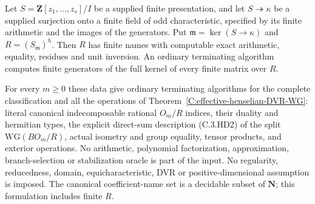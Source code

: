 \begin{theorem}
\label{C:arithmetic-henselization-WG}
Let $S=\mathbf Z[z_1,\ldots,z_s]/I$ be a supplied finite presentation,
and let $S\twoheadrightarrow\kappa$ be a supplied surjection onto a finite
field of odd characteristic, specified by its finite arithmetic and the
images of the generators.  Put $\mathfrak m=\ker(S\to\kappa)$ and
$R=(S_{\mathfrak m})^h$.
Then $R$ has finite names with computable exact arithmetic, equality,
residues and unit inversion.  An ordinary terminating algorithm computes
finite generators of the full kernel of every finite matrix over $R$.

For every $m\geq0$ these data give ordinary terminating algorithms for
the complete classification and all the operations of
Theorem~\ref{C:effective-henselian-DVR-WG}: literal canonical
indecomposable rational $O_m/R$ indices, their duality and hermitian types,
the explicit direct-sum description (C.3.HD2) of the split
$\mathrm{WG}(BO_m/R)$, actual isometry and group equality, tensor products,
and exterior operations.  No arithmetic, polynomial factorization,
approximation, branch-selection or stabilization oracle is part of the
input.  No regularity, reducedness, domain, equicharacteristic, DVR or
positive-dimensional assumption is imposed.
The canonical coefficient-name set is a decidable subset of $\mathbf N$;
this formulation includes finite $R$.
\end{theorem}
